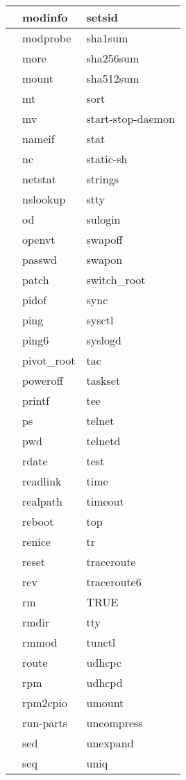 \begin{longtable}{llp{64mm}}
 & modinfo & setsid \\ \hline
 & modprobe & sha1sum \\ \hline
 & more & sha256sum \\ \hline
 & mount & sha512sum \\ \hline
 & mt & sort \\ \hline
 & mv & start-stop-daemon \\ \hline
 & nameif & stat \\ \hline
 & nc & static-sh \\ \hline
 & netstat & strings \\ \hline
 & nslookup & stty \\ \hline
 & od & sulogin \\ \hline
 & openvt & swapoff \\ \hline
 & passwd & swapon \\ \hline
 & patch & switch\_root \\ \hline
 & pidof & sync \\ \hline
 & ping & sysctl \\ \hline
 & ping6 & syslogd \\ \hline
 & pivot\_root & tac \\ \hline
 & poweroff & taskset \\ \hline
 & printf & tee \\ \hline
 & ps & telnet \\ \hline
 & pwd & telnetd \\ \hline
 & rdate & test \\ \hline
 & readlink & time \\ \hline
 & realpath & timeout \\ \hline
 & reboot & top \\ \hline
 & renice & tr \\ \hline
 & reset & traceroute \\ \hline
 & rev & traceroute6 \\ \hline
 & rm & TRUE \\ \hline
 & rmdir & tty \\ \hline
 & rmmod & tunctl \\ \hline
 & route & udhcpc \\ \hline
 & rpm & udhcpd \\ \hline
 & rpm2cpio & umount \\ \hline
 & run-parts & uncompress \\ \hline
 & sed & unexpand \\ \hline
 & seq & uniq \\ \hline

\end{longtable}
